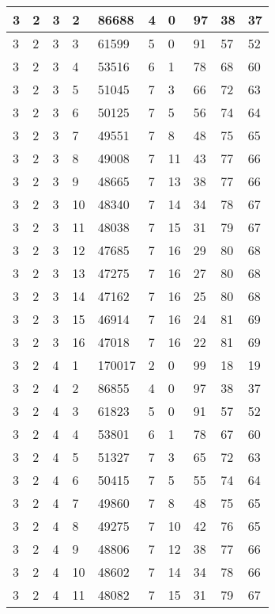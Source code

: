 \begin{table}[!ht]
\begin{tabular}{|l|l|l|l|l|l|l|l|l|l|}
        3 & 2 & 3 & 2 & 86688 & 4 & 0 & 97 & 38 & 37 \\ \hline
        3 & 2 & 3 & 3 & 61599 & 5 & 0 & 91 & 57 & 52 \\ \hline
        3 & 2 & 3 & 4 & 53516 & 6 & 1 & 78 & 68 & 60 \\ \hline
        3 & 2 & 3 & 5 & 51045 & 7 & 3 & 66 & 72 & 63 \\ \hline
        3 & 2 & 3 & 6 & 50125 & 7 & 5 & 56 & 74 & 64 \\ \hline
        3 & 2 & 3 & 7 & 49551 & 7 & 8 & 48 & 75 & 65 \\ \hline
        3 & 2 & 3 & 8 & 49008 & 7 & 11 & 43 & 77 & 66 \\ \hline
        3 & 2 & 3 & 9 & 48665 & 7 & 13 & 38 & 77 & 66 \\ \hline
        3 & 2 & 3 & 10 & 48340 & 7 & 14 & 34 & 78 & 67 \\ \hline
        3 & 2 & 3 & 11 & 48038 & 7 & 15 & 31 & 79 & 67 \\ \hline
        3 & 2 & 3 & 12 & 47685 & 7 & 16 & 29 & 80 & 68 \\ \hline
        3 & 2 & 3 & 13 & 47275 & 7 & 16 & 27 & 80 & 68 \\ \hline
        3 & 2 & 3 & 14 & 47162 & 7 & 16 & 25 & 80 & 68 \\ \hline
        3 & 2 & 3 & 15 & 46914 & 7 & 16 & 24 & 81 & 69 \\ \hline
        3 & 2 & 3 & 16 & 47018 & 7 & 16 & 22 & 81 & 69 \\ \hline
        3 & 2 & 4 & 1 & 170017 & 2 & 0 & 99 & 18 & 19 \\ \hline
        3 & 2 & 4 & 2 & 86855 & 4 & 0 & 97 & 38 & 37 \\ \hline
        3 & 2 & 4 & 3 & 61823 & 5 & 0 & 91 & 57 & 52 \\ \hline
        3 & 2 & 4 & 4 & 53801 & 6 & 1 & 78 & 67 & 60 \\ \hline
        3 & 2 & 4 & 5 & 51327 & 7 & 3 & 65 & 72 & 63 \\ \hline
        3 & 2 & 4 & 6 & 50415 & 7 & 5 & 55 & 74 & 64 \\ \hline
        3 & 2 & 4 & 7 & 49860 & 7 & 8 & 48 & 75 & 65 \\ \hline
        3 & 2 & 4 & 8 & 49275 & 7 & 10 & 42 & 76 & 65 \\ \hline
        3 & 2 & 4 & 9 & 48806 & 7 & 12 & 38 & 77 & 66 \\ \hline
        3 & 2 & 4 & 10 & 48602 & 7 & 14 & 34 & 78 & 66 \\ \hline
        3 & 2 & 4 & 11 & 48082 & 7 & 15 & 31 & 79 & 67 \\ \hline

\end{tabular}
\end{table}
